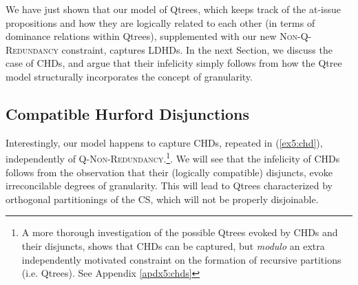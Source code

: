 \begin{exe}
	\label{ex5:minimal-path-equality-ldhd}
\end{exe} 

We have just shown that our model of Qtrees, which keeps track of the at-issue propositions and how they are logically related to each other (in terms of dominance relations within Qtrees), supplemented with our new \textsc{Non-Q-Redundancy} constraint, captures LDHDs. In the next Section, we discuss the case of CHDs, and argue that their infelicity simply follows from how the Qtree model structurally incorporates the concept of granularity.


\subsection{Compatible Hurford Disjunctions}\label{sec5:chds}

Interestingly, our model happens to capture CHDs, repeated in   (\ref{ex5:chd}), independently of \textsc{Q-Non-Redundancy}.\footnote{A more thorough investigation of the possible Qtrees evoked by CHDs and their disjuncts, shows that CHDs can be captured, but \textit{modulo} an extra independently motivated constraint on the formation of recursive partitions (i.e. Qtrees). See Appendix \ref{apdx5:chds}}. We will see that the infelicity of CHDs follows from the observation that their (logically compatible) disjuncts, evoke irreconcilable degrees of granularity. This will lead to Qtrees characterized by orthogonal partitionings of the CS, which will not be properly disjoinable.


\begin{exe}
	\begin{xlist}
	\end{xlist}
\end{exe} 

